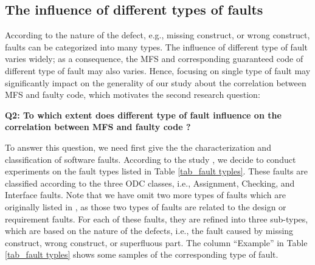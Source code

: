 \documentclass{sig-alternate-05-2015}
\begin{document}

\subsection{The influence of different types of faults}

According to the nature of the defect, e.g., missing construct, or wrong construct, faults can be categorized into many types. The influence of different type of fault varies widely; as a consequence, the MFS and corresponding guaranteed code of different type of fault may also varies. Hence, focusing on single type of fault may significantly impact on the generality of our study about the correlation between MFS and faulty code, which motivates the second research question:

\textbf{Q2: To which extent does different type of fault influence on the correlation between MFS and faulty code ?}

To answer this question, we need first give the the characterization and classification of software faults. According to the study \cite{duraes2006emulation}, we decide to conduct experiments on the fault types listed in Table \ref{tab_fault typles}. These faults are classified according to the three ODC \cite{chillarege1996orthogonal} classes, i.e., Assignment, Checking, and Interface faults. Note that we have omit two more types of faults which are originally listed in \cite{duraes2006emulation}, as those two types of faults are related to the design or requirement faults. For each of these faults, they are refined into three sub-types, which are based on the nature of the defects, i.e., the fault caused by missing construct, wrong construct, or superfluous part. The column ``Example'' in Table \ref{tab_fault typles} shows some samples of the corresponding type of fault.
\end{document}

